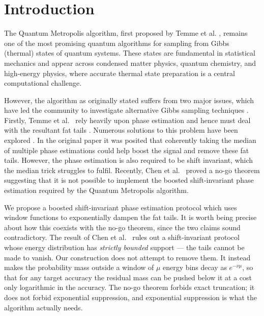 \documentclass[aps,floatfix,10pt,amssymb,amsfont,amsmath,superscriptaddress,float,nofootinbib,longbibliography,nobalancelastpage,twocolumn]{revtex4-2}
\begin{document}
\maketitle

\section{Introduction}
The Quantum Metropolis algorithm, first proposed by Temme et al. \cite{Temme_2011}, remains one of the most promising quantum algorithms for sampling from Gibbs (thermal) states of quantum systems. These states are fundamental in statistical mechanics and appear across condensed matter physics, quantum chemistry, and high-energy physics, where accurate thermal state preparation is a central computational challenge. 

However, the algorithm as originally stated suffers from two major issues, which have led the community to investigate alternative Gibbs sampling techniques \cite{chen2023quantumthermalstatepreparation,rall2023thermal,chen2021fast,shtanko2021preparing}. Firstly, Temme et al.\ \cite{Temme_2011} rely heavily upon phase estimation and hence must deal with the resultant fat tails \cite{Nielsen_Chuang_2010}. Numerous solutions to this problem have been explored \cite{rendon2022cosine,lin2022heisenberg}. In the original paper \cite{Temme_2011} it was posited that coherently taking the median of multiple phase estimations could help boost the signal and remove these fat tails. However, the phase estimation is also required to be shift invariant, which the median trick struggles to fulfil. Recently, Chen et al.\ \cite{chen2023quantumthermalstatepreparation} proved a no-go theorem suggesting that it is not possible to implement the boosted shift-invariant phase estimation required by the Quantum Metropolis algorithm.

We propose a boosted shift-invariant phase estimation protocol which uses window functions to exponentially dampen the fat tails. It is worth being precise about how this coexists with the no-go theorem, since the two claims sound contradictory. The result of Chen et al.\ \cite{chen2023quantumthermalstatepreparation} rules out a shift-invariant protocol whose energy distribution has \emph{strictly bounded} support --- the tails cannot be made to vanish. Our construction does not attempt to remove them. It instead makes the probability mass outside a window of $\mu$ energy bins decay as $e^{-\nu\mu}$, so that for any target accuracy the residual mass can be pushed below it at a cost only logarithmic in the accuracy. The no-go theorem forbids exact truncation; it does not forbid exponential suppression, and exponential suppression is what the algorithm actually needs.
\end{document}
